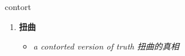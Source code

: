 
\begin{frame}
{\huge contort}
\begin{center}
\begin{enumerate}\Large
  \item \textbf{扭曲}
  \begin{itemize}
    \item \em{\Large{a contorted version of truth 扭曲的真相}}
  \end{itemize}
\end{enumerate}
\end{center}
\end{frame}
